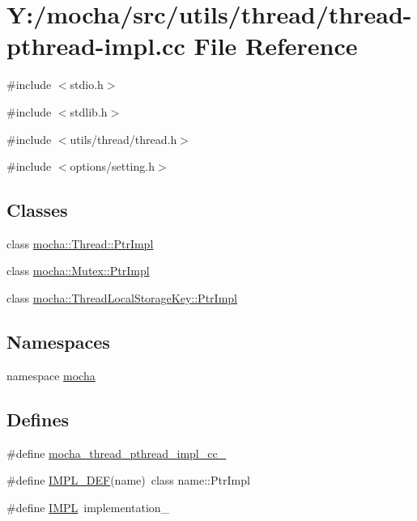 \hypertarget{thread-pthread-impl_8cc}{
\section{Y:/mocha/src/utils/thread/thread-\/pthread-\/impl.cc File Reference}
\label{thread-pthread-impl_8cc}
}
{\ttfamily \#include $<$stdio.h$>$}\par
{\ttfamily \#include $<$stdlib.h$>$}\par
{\ttfamily \#include $<$utils/thread/thread.h$>$}\par
{\ttfamily \#include $<$options/setting.h$>$}\par
\subsection*{Classes}
\begin{DoxyCompactItemize}
\item 
class \hyperlink{classmocha_1_1_thread_1_1_ptr_impl}{mocha::Thread::PtrImpl}
\item 
class \hyperlink{classmocha_1_1_mutex_1_1_ptr_impl}{mocha::Mutex::PtrImpl}
\item 
class \hyperlink{classmocha_1_1_thread_local_storage_key_1_1_ptr_impl}{mocha::ThreadLocalStorageKey::PtrImpl}
\end{DoxyCompactItemize}
\subsection*{Namespaces}
\begin{DoxyCompactItemize}
\item 
namespace \hyperlink{namespacemocha}{mocha}
\end{DoxyCompactItemize}
\subsection*{Defines}
\begin{DoxyCompactItemize}
\item 
\#define \hyperlink{thread-pthread-impl_8cc_a977eed8b05d8776e52d366759c78fac2}{mocha\_\-thread\_\-pthread\_\-impl\_\-cc\_\-}
\item 
\#define \hyperlink{thread-pthread-impl_8cc_a343c21bf5818830fa6070bdb2a06282e}{IMPL\_\-DEF}(name)~class name::PtrImpl
\item 
\#define \hyperlink{thread-pthread-impl_8cc_a750877e0398a37cb8f03443558fb7f6f}{IMPL}~implementation\_\-
\end{DoxyCompactItemize}
